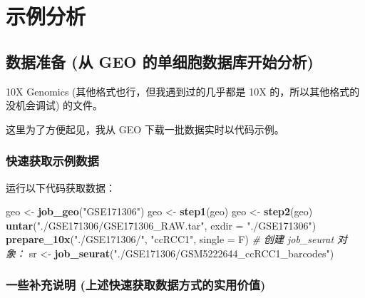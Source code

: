 \documentclass[
]{article}
\newenvironment{Shaded}{\begin{snugshade}}{\end{snugshade}}
\newcommand{\CommentTok}[1]{\textcolor[rgb]{0.56,0.35,0.01}{\textit{#1}}}
\newcommand{\DataTypeTok}[1]{\textcolor[rgb]{0.13,0.29,0.53}{#1}}
\newcommand{\KeywordTok}[1]{\textcolor[rgb]{0.13,0.29,0.53}{\textbf{#1}}}
\newcommand{\NormalTok}[1]{#1}
\newcommand{\StringTok}[1]{\textcolor[rgb]{0.31,0.60,0.02}{#1}}
\begin{document}
\hypertarget{ux793aux4f8bux5206ux6790}{%
\section{示例分析}\label{ux793aux4f8bux5206ux6790}}

\hypertarget{ux6570ux636eux51c6ux5907-ux4ece-geo-ux7684ux5355ux7ec6ux80deux6570ux636eux5e93ux5f00ux59cbux5206ux6790}{%
\subsection{数据准备 (从 GEO 的单细胞数据库开始分析)}\label{ux6570ux636eux51c6ux5907-ux4ece-geo-ux7684ux5355ux7ec6ux80deux6570ux636eux5e93ux5f00ux59cbux5206ux6790}}

10X Genomics (其他格式也行，但我遇到过的几乎都是 10X 的，所以其他格式的没机会调试) 的文件。

这里为了方便起见，我从 GEO 下载一批数据实时以代码示例。

\hypertarget{obtain}{%
\subsubsection{快速获取示例数据}\label{obtain}}

运行以下代码获取数据：

\begin{Shaded}
\begin{Highlighting}[]
\NormalTok{geo \textless{}{-}}\StringTok{ }\KeywordTok{job\_geo}\NormalTok{(}\StringTok{"GSE171306"}\NormalTok{)}
\NormalTok{geo \textless{}{-}}\StringTok{ }\KeywordTok{step1}\NormalTok{(geo)}
\NormalTok{geo \textless{}{-}}\StringTok{ }\KeywordTok{step2}\NormalTok{(geo)}
\KeywordTok{untar}\NormalTok{(}\StringTok{"./GSE171306/GSE171306\_RAW.tar"}\NormalTok{, }\DataTypeTok{exdir =} \StringTok{"./GSE171306"}\NormalTok{)}
\KeywordTok{prepare\_10x}\NormalTok{(}\StringTok{"./GSE171306/"}\NormalTok{, }\StringTok{"ccRCC1"}\NormalTok{, }\DataTypeTok{single =}\NormalTok{ F)}
\CommentTok{\# 创建 job\_seurat 对象：}
\NormalTok{sr \textless{}{-}}\StringTok{ }\KeywordTok{job\_seurat}\NormalTok{(}\StringTok{"./GSE171306/GSM5222644\_ccRCC1\_barcodes"}\NormalTok{)}
\end{Highlighting}
\end{Shaded}

\hypertarget{ux4e00ux4e9bux8865ux5145ux8bf4ux660e-ux4e0aux8ff0ux5febux901fux83b7ux53d6ux6570ux636eux65b9ux5f0fux7684ux5b9eux7528ux4ef7ux503c}{%
\subsubsection{一些补充说明 (上述快速获取数据方式的实用价值)}\label{ux4e00ux4e9bux8865ux5145ux8bf4ux660e-ux4e0aux8ff0ux5febux901fux83b7ux53d6ux6570ux636eux65b9ux5f0fux7684ux5b9eux7528ux4ef7ux503c}}
\end{document}
